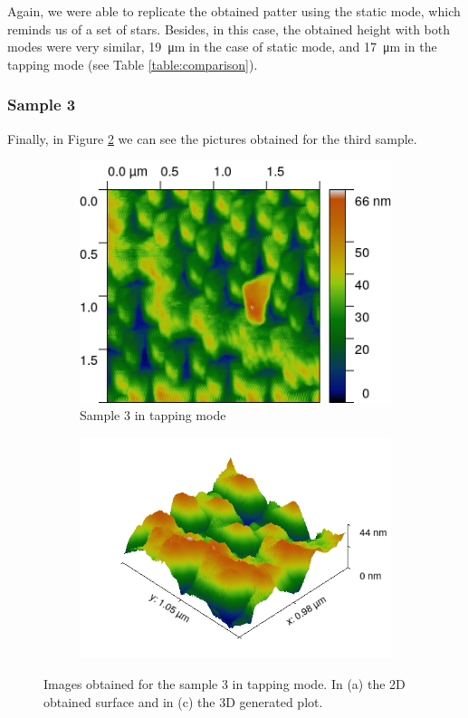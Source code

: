 \documentclass[11pt,a4paper]{article}
\begin{document}
Again, we were able to replicate the obtained patter using the static mode, which reminds us of a set of stars. Besides, in this case, the obtained height with both modes were very similar, \SI{19}{\micro\m} in the case of static mode, and \SI{17}{\micro\m} in the tapping mode (see Table \ref{table:comparison}).

\subsubsection{Sample 3}

Finally, in Figure \ref{fig:tapping_sample3} we can see the pictures obtained for the third sample.

\begin{figure}[H]
\centering
\begin{subfigure}[b]{0.45\textwidth}
\includegraphics[width=\textwidth]{tm_sample3}
\caption{Sample 3 in tapping mode}
\label{fig:}
\end{subfigure}
\begin{subfigure}[b]{0.45\textwidth}
\includegraphics[width=\textwidth]{tm_sample3_3D}
\caption{}
\end{subfigure}
\caption{Images obtained for the sample 3 in tapping mode. In (a) the 2D obtained surface and in (c) the 3D generated plot.}
\label{fig:tapping_sample3}
\end{figure}
\end{document}
